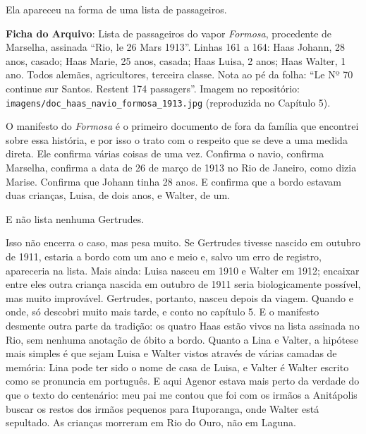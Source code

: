 \documentclass[
  brazilian,
  11pt,
  openany]{book}
\begin{document}
Ela apareceu na forma de uma lista de passageiros.

\begin{ficha}

\textbf{Ficha do Arquivo}: Lista de passageiros do vapor \emph{Formosa},
procedente de Marselha, assinada ``Rio, le 26 Mars 1913''. Linhas 161 a
164: Haas Johann, 28 anos, casado; Haas Marie, 25 anos, casada; Haas
Luisa, 2 anos; Haas Walter, 1 ano. Todos alemães, agricultores, terceira
classe. Nota ao pé da folha: ``Le Nº 70 continue sur Santos. Restent 174
passagers''. Imagem no repositório:
\texttt{imagens/doc\_haas\_navio\_formosa\_1913.jpg} (reproduzida no
Capítulo 5).

\end{ficha}

O manifesto do \emph{Formosa} é o primeiro documento de fora da família
que encontrei sobre essa história, e por isso o trato com o respeito que
se deve a uma medida direta. Ele confirma várias coisas de uma vez.
Confirma o navio, confirma Marselha, confirma a data de 26 de março de
1913 no Rio de Janeiro, como dizia Marise. Confirma que Johann tinha 28
anos. E confirma que a bordo estavam duas crianças, Luisa, de dois anos,
e Walter, de um.

E não lista nenhuma Gertrudes.

Isso não encerra o caso, mas pesa muito. Se Gertrudes tivesse nascido em
outubro de 1911, estaria a bordo com um ano e meio e, salvo um erro de
registro, apareceria na lista. Mais ainda: Luisa nasceu em 1910 e Walter
em 1912; encaixar entre eles outra criança nascida em outubro de 1911
seria biologicamente possível, mas muito improvável. Gertrudes,
portanto, nasceu depois da viagem. Quando e onde, só descobri muito mais
tarde, e conto no capítulo 5. E o manifesto desmente outra parte da
tradição: os quatro Haas estão vivos na lista assinada no Rio, sem
nenhuma anotação de óbito a bordo. Quanto a Lina e Valter, a hipótese
mais simples é que sejam Luisa e Walter vistos através de várias camadas
de memória: Lina pode ter sido o nome de casa de Luisa, e Valter é
Walter escrito como se pronuncia em português. E aqui Agenor estava mais
perto da verdade do que o texto do centenário: meu pai me contou que foi
com os irmãos a Anitápolis buscar os restos dos irmãos pequenos para
Ituporanga, onde Walter está sepultado. As crianças morreram em Rio do
Ouro, não em Laguna.
\end{document}
